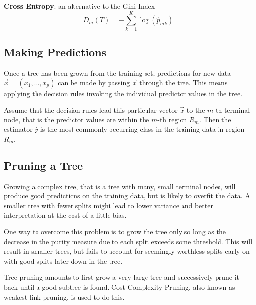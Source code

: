 \documentclass[11pt]{article}
\theoremstyle{definition}
\begin{document}
\vspace{1em}
\textbf{Cross Entropy}: an alternative to the Gini Index
\begin{equation*}
	D_m(T) = -\sum_{k=1}^{K} \log(\hat{p}_{mk})
\end{equation*}

\subsection{Making Predictions}
Once a tree has been grown from the training set, predictions for new data $\vec{x} = (x_1, \dots, x_p)$ can be made by passing $\vec{x}$ through the tree. This means applying the decision rules invoking the individual predictor values in the tree.

Assume that the decision rules lead this particular vector $\vec{x}$ to the $m$-th terminal node, that is the predictor values are within the $m$-th region $R_m$. Then the estimator $\hat{y}$ is the most commonly occurring class in the training data in region $R_m$.

\subsection{Pruning a Tree}
Growing a complex tree, that is a tree with many, small terminal nodes, will produce good predictions on the training data, but is likely to overfit the data. A smaller tree with fewer splits might lead to lower variance and better interpretation at the cost of a little bias.

One way to overcome this problem is to grow the tree only so long as the decrease in the purity measure due to each split exceeds some threshold. This will result in smaller trees, but fails to account for seemingly worthless splits early on with good splits later down in the tree.

Tree pruning amounts to first grow a very large tree and successively prune it back until a good subtree is found. Cost Complexity Pruning, also known as weakest link pruning, is used to do this.
\end{document}
